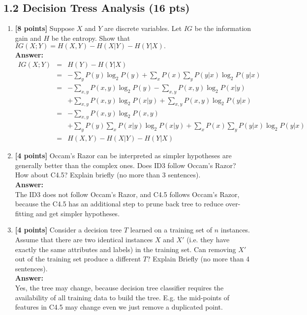 \subsection*{1.2 Decision Tress Analysis (16 pts)}

\begin{enumerate}

\item\textbf{[8 points]} Suppose $X$ and $Y$ are discrete variables. Let $IG$ be the information gain and $H$ be the entropy. Show that $IG(X;Y) = H(X,Y) - H(X|Y) - H(Y|X).$
\\\textbf{Answer:}\\
\begin{equation}
\nonumber
\begin{array}{rcl}
IG(X;Y) & = & H(Y) - H(Y|X) \\
		& = & -\sum_y P(y)\log_2P(y) + \sum_x P(x) \sum_y P(y|x)\log_2P(y|x) \\
		& = & -\sum_{x,y} P(x,y)\log_2P(y) -\sum_{x,y} P(x,y)\log_2P(x|y) \\
		&   & +\sum_{x,y} P(x,y)\log_2P(x|y) +\sum_{x,y} P(x,y)\log_2P(y|x) \\
		& = & -\sum_{x,y} P(x,y)\log_2P(x,y) \\
		&   & + \sum_y P(y) \sum_x P(x|y)\log_2P(x|y) + \sum_x P(x) \sum_y P(y|x)\log_2P(y|x) \\
		& = & H(X,Y) - H(X|Y) - H(Y|X)
\end{array}
\end{equation}

\item\textbf{[4 points]} Occam's Razor can be interpreted as simpler hypotheses are generally better than the complex ones. Does ID3 follow Occam's Razor? How about C4.5? Explain briefly (no more than 3 sentences).
\\\textbf{Answer:}\\
The ID3 does not follow Occam's Razor, and C4.5 follows Occam's Razor, because the C4.5 has an additional step to prune back tree to reduce over-fitting and get simpler hypotheses.

\item\textbf{[4 points]} Consider a decision tree $T$ learned on a training set of $n$ instances. Assume that there are two identical instances $X$ and $X\prime$ (i.e. they have exactly the same attributes and labels) in the training set. Can removing $X\prime$ out of the training set produce a different $T$? Explain Briefly (no more than 4 sentences).
\\\textbf{Answer:}\\
Yes, the tree may change, because decision tree classifier requires the availability of all training data to build the tree. E.g. the mid-points of features in C4.5 may change even we just remove a duplicated point.

\end{enumerate}


\newpage
